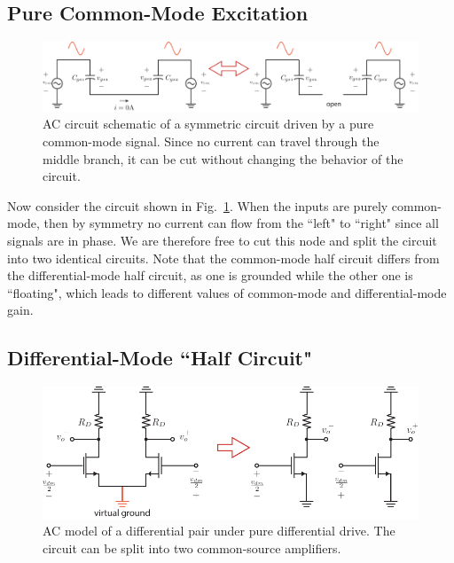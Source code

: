 \subsection{Pure Common-Mode Excitation}

\begin{figure}[tb]
\begin{center}
\includegraphics[width=\columnwidth]{CM_model.pdf}
\end{center}
\caption{AC circuit schematic of a symmetric circuit driven by a pure common-mode signal.  Since no current can travel through the middle branch, it can be cut without changing the behavior of the circuit.} \label{fig:CM_model.pdf}
\end{figure}

Now consider the circuit shown in Fig.~\ref{fig:CM_model.pdf}.  When the inputs are purely common-mode, then by symmetry no current can flow from the ``left" to ``right" since all signals are in phase.  We are therefore free to cut this node and split the circuit into two identical circuits.  Note that the common-mode half circuit differs from the differential-mode half circuit, as one is grounded while the other one is ``floating", which leads to different values of common-mode and differential-mode gain.
 


\subsection{Differential-Mode ``Half Circuit"}

\begin{figure}[tb]
\begin{center}
\includegraphics[scale=1]{Diff_Pair_DM_Drive.pdf}
\end{center}
\caption{AC model of a differential pair under pure differential drive.   The circuit can be split into two common-source amplifiers.} \label{fig:Diff_Pair_DM_Drive.pdf}
\end{figure}

